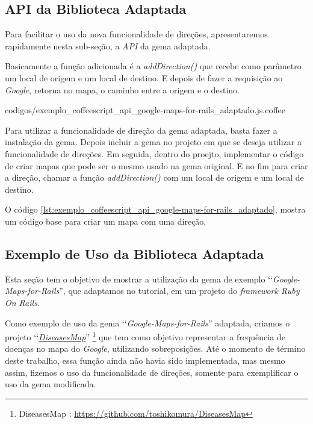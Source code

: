 \subsection{API da Biblioteca Adaptada}
\label{subsection:api_da_biblioteca_adaptada}


Para facilitar o uso da nova funcionalidade de direções, apresentaremos rapidamente nesta sub-seção,
a \emph{API} da gema adaptada.

Basicamente a função adicionada é a \emph{addDirection()} que recebe como parâmetro um local de origem
e um local de destino. E depois de fazer a requisição ao \emph{Google}, retorna no mapa, o caminho entre
a origem e o destino.


{codigos/exemplo_coffeescript_api_google-maps-for-rails_adaptado.js.coffee}

Para utilizar a funcionalidade de direção da gema adaptada, basta fazer a instalação da gema. Depois incluir
a gema no projeto em que se deseja utilizar a funcionalidade de direções. Em seguida, dentro do proejto,
implementar o código de criar mapas que pode ser o mesmo usado na gema original.
E no fim para criar a direção, chamar a função \emph{addDirection()} com um local de origem e um local de destino.

O código \ref{lst:exemplo_coffeescript_api_google-maps-for-rails_adaptado}, mostra um código base para criar um
mapa com uma direção.


\subsection{Exemplo de Uso da Biblioteca Adaptada}
\label{subsection:exemplo_de_uso_da_biblioteca_adaptada}

Esta seção tem o objetivo de mostrar a utilização da gema de exemplo ‘‘\emph{Google-Maps-for-Rails}'',
que adaptamos no tutorial, em um projeto do \emph{framework Ruby On Rails}.

Como exemplo de uso da gema ‘‘\emph{Google-Maps-for-Rails}'' adaptada, criamos o projeto 
‘‘\emph{\href{https://github.com/toshikomura/DiseasesMap}{DiseasesMap}}'' 
\footnote{DiseasesMap : \url{https://github.com/toshikomura/DiseasesMap}} que tem como objetivo representar 
a frequência de doenças no mapa do \emph{Google}, utilizando sobreposições. Até o momento de término deste
trabalho, essa função ainda não havia sido implementada, mas mesmo assim, fizemos o uso da
funcionalidade de direções, somente para exemplificar o uso da gema modificada.

